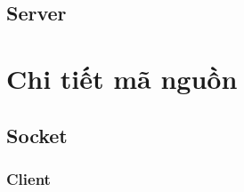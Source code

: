     
\subsection{Server}














\section{Chi tiết mã nguồn}
\subsection{Socket} \label{socket}
\subsubsection{Client} \label{clientSocket}
